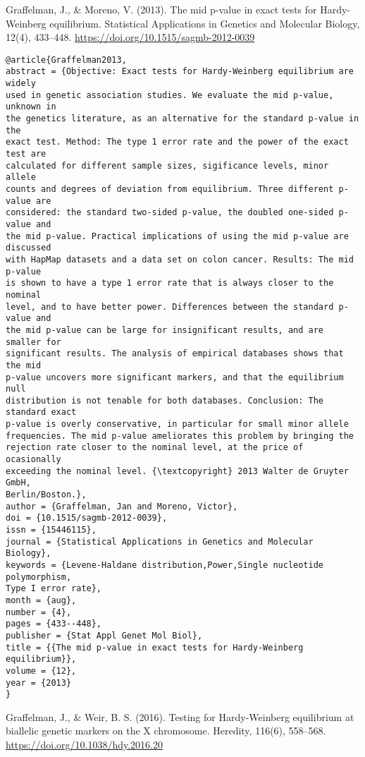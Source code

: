 \documentclass[]{article}
\begin{document}
Graffelman, J., \& Moreno, V. (2013). The mid p-value in exact tests for Hardy-Weinberg equilibrium. Statistical Applications in Genetics and Molecular Biology, 12(4), 433–448. \url{https://doi.org/10.1515/sagmb-2012-0039}

\begin{verbatim}
@article{Graffelman2013,
abstract = {Objective: Exact tests for Hardy-Weinberg equilibrium are widely
used in genetic association studies. We evaluate the mid p-value, unknown in
the genetics literature, as an alternative for the standard p-value in the
exact test. Method: The type 1 error rate and the power of the exact test are
calculated for different sample sizes, sigificance levels, minor allele
counts and degrees of deviation from equilibrium. Three different p-value are
considered: the standard two-sided p-value, the doubled one-sided p-value and
the mid p-value. Practical implications of using the mid p-value are discussed
with HapMap datasets and a data set on colon cancer. Results: The mid p-value
is shown to have a type 1 error rate that is always closer to the nominal
level, and to have better power. Differences between the standard p-value and
the mid p-value can be large for insignificant results, and are smaller for
significant results. The analysis of empirical databases shows that the mid
p-value uncovers more significant markers, and that the equilibrium null
distribution is not tenable for both databases. Conclusion: The standard exact
p-value is overly conservative, in particular for small minor allele
frequencies. The mid p-value ameliorates this problem by bringing the
rejection rate closer to the nominal level, at the price of ocasionally
exceeding the nominal level. {\textcopyright} 2013 Walter de Gruyter GmbH,
Berlin/Boston.},
author = {Graffelman, Jan and Moreno, Victor},
doi = {10.1515/sagmb-2012-0039},
issn = {15446115},
journal = {Statistical Applications in Genetics and Molecular Biology},
keywords = {Levene-Haldane distribution,Power,Single nucleotide polymorphism,
Type I error rate},
month = {aug},
number = {4},
pages = {433--448},
publisher = {Stat Appl Genet Mol Biol},
title = {{The mid p-value in exact tests for Hardy-Weinberg equilibrium}},
volume = {12},
year = {2013}
}
\end{verbatim}

Graffelman, J., \& Weir, B. S. (2016). Testing for Hardy-Weinberg equilibrium at biallelic genetic markers on the X chromosome. Heredity, 116(6), 558–568. \url{https://doi.org/10.1038/hdy.2016.20}
\end{document}
